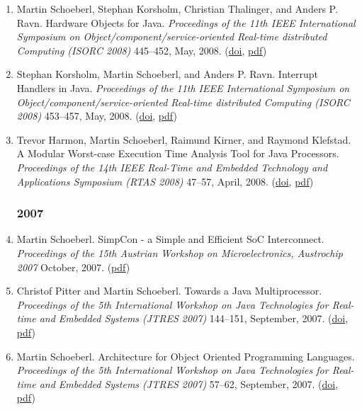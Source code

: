 \begin{enumerate}
\item Martin Schoeberl, Stephan Korsholm, Christian Thalinger, and Anders P. Ravn.
 Hardware Objects for Java.
 \emph{Proceedings of the 11th IEEE International Symposium on Object/component/service-oriented Real-time distributed Computing (ISORC 2008)} 445--452, May, 2008.
(\href{http://dx.doi.org/10.1109/ISORC.2008.63}{doi}, \href{http://www.jopdesign.com/doc/hwobj.pdf}{pdf})

\item Stephan Korsholm, Martin Schoeberl, and Anders P. Ravn.
 Interrupt Handlers in Java.
 \emph{Proceedings of the 11th IEEE International Symposium on Object/component/service-oriented Real-time distributed Computing (ISORC 2008)} 453--457, May, 2008.
(\href{http://dx.doi.org/10.1109/ISORC.2008.68}{doi}, \href{http://www.jopdesign.com/doc/ihjava_isorc2008.pdf}{pdf})

\item Trevor Harmon, Martin Schoeberl, Raimund Kirner, and Raymond Klefstad.
 A Modular Worst-case Execution Time Analysis Tool for Java Processors.
 \emph{Proceedings of the 14th IEEE Real-Time and Embedded Technology and Applications Symposium (RTAS 2008)} 47--57, April, 2008.
(\href{http://dx.doi.org/10.1109/RTAS.2008.34}{doi}, \href{http://www.jopdesign.com/doc/volta_rtas2008.pdf}{pdf})


\subsubsection*{2007}

\item Martin Schoeberl.
 SimpCon - a Simple and Efficient SoC Interconnect.
 \emph{Proceedings of the 15th Austrian Workshop on Microelectronics, Austrochip 2007} October, 2007.
(\href{http://www.jopdesign.com/doc/simpcon_austrochip2007.pdf}{pdf})

\item Christof Pitter and Martin Schoeberl.
 Towards a Java Multiprocessor.
 \emph{Proceedings of the 5th International Workshop on Java Technologies for Real-time and Embedded Systems (JTRES 2007)} 144--151, September, 2007.
(\href{http://dx.doi.org/http://doi.acm.org/10.1145/1288940.1288962}{doi}, \href{http://www.jopdesign.com/doc/jopcmp.pdf}{pdf})

\item Martin Schoeberl.
 Architecture for Object Oriented Programming Languages.
 \emph{Proceedings of the 5th International Workshop on Java Technologies for Real-time and Embedded Systems (JTRES 2007)} 57--62, September, 2007.
(\href{http://dx.doi.org/10.1145/1288940.1288949}{doi}, \href{http://www.jopdesign.com/doc/oohw.pdf}{pdf})


\end{enumerate}
